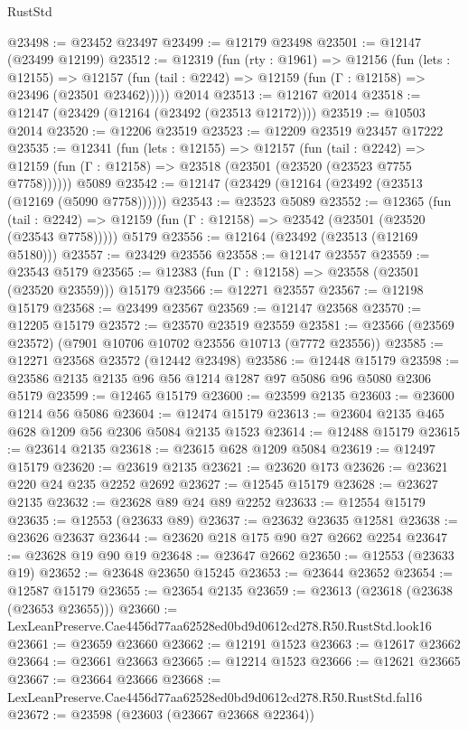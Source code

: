 \begin{lexlean}{RustStd}
\begin{coremodule}
@23498 := @23452 @23497
@23499 := @12179 @23498
@23501 := @12147 (@23499 @12199)
@23512 := @12319
    (fun (rty : @1961) =>
    @12156
      (fun (lets : @12155) =>
      @12157 (fun (tail : @2242) => @12159 (fun (Γ : @12158) => @23496 (@23501 @23462)))))
    @2014
@23513 := @12167 @2014
@23518 := @12147 (@23429 (@12164 (@23492 (@23513 @12172))))
@23519 := @10503 @2014
@23520 := @12206 @23519
@23523 := @12209 @23519 @23457 @17222
@23535 := @12341
    (fun (lets : @12155) =>
    @12157
      (fun (tail : @2242) =>
      @12159 (fun (Γ : @12158) => @23518 (@23501 (@23520 (@23523 @7755 @7758))))))
    @5089
@23542 := @12147 (@23429 (@12164 (@23492 (@23513 (@12169 (@5090 @7758))))))
@23543 := @23523 @5089
@23552 := @12365
    (fun (tail : @2242) => @12159 (fun (Γ : @12158) => @23542 (@23501 (@23520 (@23543 @7758)))))
    @5179
@23556 := @12164 (@23492 (@23513 (@12169 @5180)))
@23557 := @23429 @23556
@23558 := @12147 @23557
@23559 := @23543 @5179
@23565 := @12383 (fun (Γ : @12158) => @23558 (@23501 (@23520 @23559))) @15179
@23566 := @12271 @23557
@23567 := @12198 @15179
@23568 := @23499 @23567
@23569 := @12147 @23568
@23570 := @12205 @15179
@23572 := @23570 @23519 @23559
@23581 := @23566 (@23569 @23572) (@7901 @10706 @10702 @23556 @10713 (@7772 @23556))
@23585 := @12271 @23568 @23572 (@12442 @23498)
@23586 := @12448 @15179
@23598 := @23586 @2135 @2135 @96 @56 @1214 @1287 @97 @5086 @96 @5080 @2306 @5179
@23599 := @12465 @15179
@23600 := @23599 @2135
@23603 := @23600 @1214 @56 @5086
@23604 := @12474 @15179
@23613 := @23604 @2135 @465 @628 @1209 @56 @2306 @5084 @2135 @1523
@23614 := @12488 @15179
@23615 := @23614 @2135
@23618 := @23615 @628 @1209 @5084
@23619 := @12497 @15179
@23620 := @23619 @2135
@23621 := @23620 @173
@23626 := @23621 @220 @24 @235 @2252 @2692
@23627 := @12545 @15179
@23628 := @23627 @2135
@23632 := @23628 @89 @24 @89 @2252
@23633 := @12554 @15179
@23635 := @12553 (@23633 @89)
@23637 := @23632 @23635 @12581
@23638 := @23626 @23637
@23644 := @23620 @218 @175 @90 @27 @2662 @2254
@23647 := @23628 @19 @90 @19
@23648 := @23647 @2662
@23650 := @12553 (@23633 @19)
@23652 := @23648 @23650 @15245
@23653 := @23644 @23652
@23654 := @12587 @15179
@23655 := @23654 @2135
@23659 := @23613 (@23618 (@23638 (@23653 @23655)))
@23660 := LexLeanPreserve.Cae4456d77aa62528ed0bd9d0612cd278.R50.RustStd.look16
@23661 := @23659 @23660
@23662 := @12191 @1523
@23663 := @12617 @23662
@23664 := @23661 @23663
@23665 := @12214 @1523
@23666 := @12621 @23665
@23667 := @23664 @23666
@23668 := LexLeanPreserve.Cae4456d77aa62528ed0bd9d0612cd278.R50.RustStd.fal16
@23672 := @23598 (@23603 (@23667 @23668 @22364))

\end{coremodule}
\end{lexlean}
